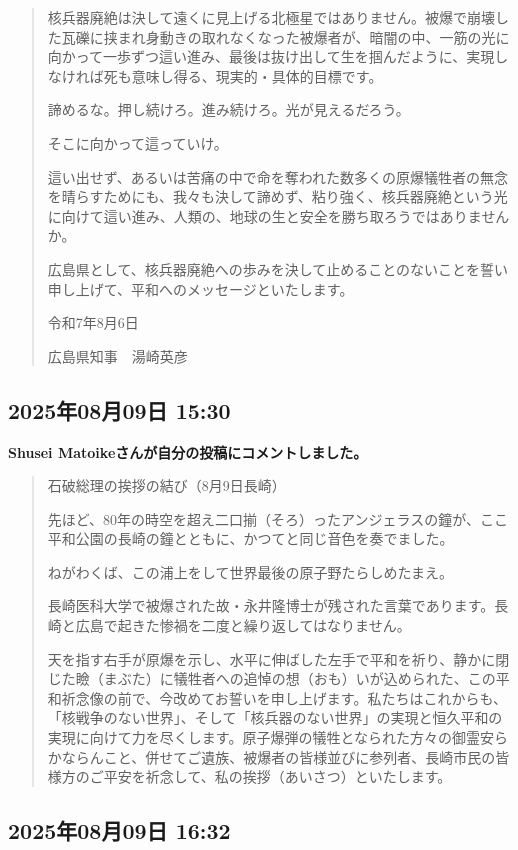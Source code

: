 \begin{quote}
核兵器廃絶は決して遠くに見上げる北極星ではありません。被爆で崩壊した瓦礫に挟まれ身動きの取れなくなった被爆者が、暗闇の中、一筋の光に向かって一歩ずつ這い進み、最後は抜け出して生を掴んだように、実現しなければ死も意味し得る、現実的・具体的目標です。

諦めるな。押し続けろ。進み続けろ。光が見えるだろう。

そこに向かって這っていけ。

這い出せず、あるいは苦痛の中で命を奪われた数多くの原爆犠牲者の無念を晴らすためにも、我々も決して諦めず、粘り強く、核兵器廃絶という光に向けて這い進み、人類の、地球の生と安全を勝ち取ろうではありませんか。

広島県として、核兵器廃絶への歩みを決して止めることのないことを誓い申し上げて、平和へのメッセージといたします。

令和7年8月6日

広島県知事　湯崎英彦
\end{quote}

\subsection*{2025年08月09日 15:30}

\textbf{Shusei Matoikeさんが自分の投稿にコメントしました。}

\begin{quote}
石破総理の挨拶の結び（8月9日長崎）

先ほど、80年の時空を超え二口揃（そろ）ったアンジェラスの鐘が、ここ平和公園の長崎の鐘とともに、かつてと同じ音色を奏でました。

ねがわくば、この浦上をして世界最後の原子野たらしめたまえ。

長崎医科大学で被爆された故・永井隆博士が残された言葉であります。長崎と広島で起きた惨禍を二度と繰り返してはなりません。

天を指す右手が原爆を示し、水平に伸ばした左手で平和を祈り、静かに閉じた瞼（まぶた）に犠牲者への追悼の想（おも）いが込められた、この平和祈念像の前で、今改めてお誓いを申し上げます。私たちはこれからも、「核戦争のない世界」、そして「核兵器のない世界」の実現と恒久平和の実現に向けて力を尽くします。原子爆弾の犠牲となられた方々の御霊安らかならんこと、併せてご遺族、被爆者の皆様並びに参列者、長崎市民の皆様方のご平安を祈念して、私の挨拶（あいさつ）といたします。
\end{quote}

\subsection*{2025年08月09日 16:32}


